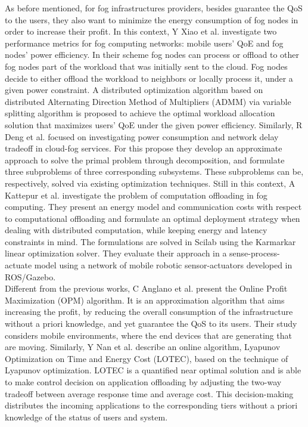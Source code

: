 \noindent\tab As before mentioned, for fog infrastructures providers, besides guarantee the QoS to the users, they also want to minimize the energy consumption of fog nodes in order to increase their profit. In this context, Y Xiao et al. \cite{xiao2017qoe} investigate two performance metrics for fog computing networks: mobile users’ QoE and fog nodes’ power efficiency. In their scheme fog nodes can process or offload to other fog nodes part of the workload that was initially sent to the cloud. Fog nodes decide to either offload the workload to neighbors or locally process it, under a given power constraint. A distributed optimization algorithm based on distributed Alternating Direction Method of Multipliers (ADMM) via variable splitting algorithm is proposed to achieve the optimal workload allocation solution that maximizes users’ QoE under the given power efficiency. Similarly, R Deng et al. \cite{deng2016optimal} focused on investigating power consumption and network delay tradeoff in cloud-fog services. For this propose they develop an approximate approach to solve the primal problem through decomposition, and formulate three subproblems of three corresponding subsystems. These subproblems can be, respectively, solved via existing optimization techniques. Still in this context, A Kattepur et al. \cite{kattepur2016resource} investigate the problem of computation offloading in fog computing. They present an energy model and communication costs with respect to computational offloading and formulate an optimal deployment strategy when dealing with distributed computation, while keeping energy and latency constraints in mind. The formulations are solved in Scilab using the Karmarkar linear optimization solver. They evaluate their approach in a sense-process-actuate model using a network of mobile robotic sensor-actuators developed in ROS/Gazebo.\\
\noindent\tab Different from the previous works, C Anglano et al. \cite{anglano2018profit} present the Online Profit Maximization (OPM) algorithm. It is an approximation algorithm that aims increasing the profit, by reducing the overall consumption of the infrastructure without a priori knowledge, and yet guarantee the QoS to its users. Their study considers mobile environments, where the end devices that are generating that are moving. Similarly, Y Nan et al. \cite{nan2017adaptive} describe an online algorithm, Lyapunov Optimization on Time and Energy Cost (LOTEC), based on the technique of Lyapunov optimization. LOTEC is a quantified near optimal solution and is able to make control decision on application offloading by adjusting the two-way tradeoff between average response time and average cost. This decision-making distributes the incoming applications to the corresponding tiers without a priori knowledge of the status of users and system.